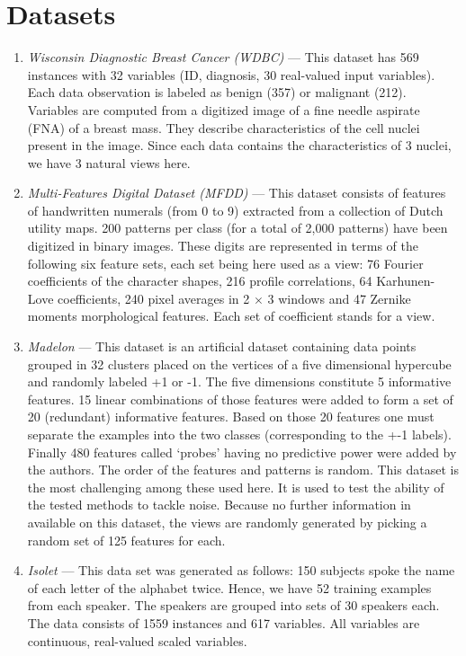 \section{Datasets}
\label{sec:app-datasets}

	\begin{enumerate}
        \item \textit{Wisconsin Diagnostic Breast Cancer (WDBC)} --- This dataset has 569 instances with 32  variables (ID, diagnosis, 30 real-valued input variables). Each data observation is labeled as benign (357) or malignant (212). Variables are computed from a digitized image of a fine needle aspirate (FNA) of a breast mass.  They describe characteristics of the cell nuclei present in the image. Since each data contains the characteristics of 3 nuclei, we have 3 natural views here.\\
        \item \textit{Multi-Features Digital Dataset (MFDD)} --- This dataset consists of features of handwritten numerals (from 0 to 9) extracted from a collection of Dutch utility maps. 200 patterns per class (for a total of 2,000 patterns) have been digitized in binary images. These digits are represented in terms of the following six feature sets, each set being here used as a view: 76 Fourier coefficients of the character shapes, 216 profile correlations, 64 Karhunen-Love coefficients, 240 pixel averages in 2 $\times$ 3 windows and 47 Zernike moments morphological features. Each set of coefficient stands for a view.\\
        \item \textit{Madelon} --- This dataset is an artificial dataset containing data points grouped in 32 clusters placed on the vertices of a five dimensional hypercube and randomly labeled +1 or -1. The five dimensions constitute 5 informative features. 15 linear combinations of those features were added to form a set of 20 (redundant) informative features. Based on those 20 features one must separate the examples into the two classes (corresponding to the +-1 labels). Finally 480 features called `probes' having no predictive power were added by the authors. The order of the features and patterns is random. This dataset is the most challenging among these used here. It is used to test the ability of the tested methods to tackle noise. Because no further information in available on this dataset, the views are randomly generated by picking a random set of 125 features for each.\\
	\item \textit{Isolet} --- This data set was generated as follows: 150 subjects spoke the name of each letter of the alphabet twice. Hence, we have 52 training examples from each speaker. The speakers are grouped into sets of 30 speakers each. The data consists of 1559 instances and 617 variables. All variables are continuous, real-valued scaled variables.\\

\end{enumerate}

